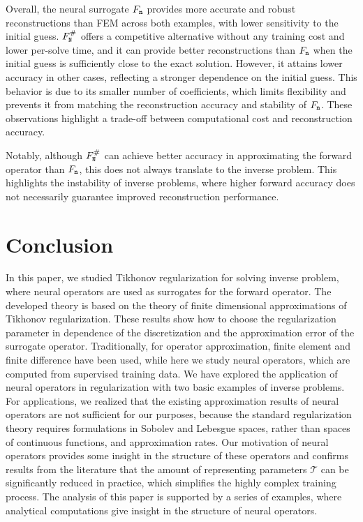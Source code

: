 \documentclass[10pt]{article}
\numberwithin{equation}{section}
\theoremstyle{nonumberplain}
\newcommand{\n}{{\tt n}}
\newcommand{\no}{{\tt N}}
\begin{document}
Overall, the neural surrogate $F_\n$ provides more accurate and robust reconstructions than FEM across both examples, with lower sensitivity to the initial guess. $F_\no^\#$ offers a competitive alternative without any training cost and lower per-solve time, and it can provide better reconstructions than $F_\n$ when the initial guess is sufficiently close to the exact solution. However, it attains lower accuracy in other cases, reflecting a stronger dependence on the initial guess. This behavior is due to its smaller number of coefficients, which limits flexibility and prevents it from matching the reconstruction accuracy and stability of $F_\n$. These observations highlight a trade-off between computational cost and reconstruction accuracy.

Notably, although $F_\no^\#$ can achieve better accuracy in approximating the forward operator than $F_\n$, this does not always translate to the inverse problem. This highlights the instability of inverse problems, where higher forward accuracy does not necessarily guarantee improved reconstruction performance.

\section*{Conclusion}
\label{se:conclusion}

In this paper, we studied Tikhonov regularization for solving inverse problem, where neural operators are used as surrogates for the forward operator. The developed theory is based on the theory of finite dimensional approximations of Tikhonov regularization. These results show how to choose the regularization parameter in dependence of the discretization and the approximation error of the surrogate operator. Traditionally, for operator approximation, finite element and finite difference have been used, while here we study neural operators, which are computed from supervised training data.
We have explored the application of neural operators in regularization with two basic examples of inverse problems. For applications, we realized that the existing approximation results of neural operators are not sufficient for our purposes, because the standard regularization theory requires formulations in Sobolev and Lebesgue spaces, rather than spaces of continuous functions, and approximation rates. Our motivation of neural operators provides some insight in the structure of these operators and confirms results from the literature that the amount of representing parameters $\mathcal{T}$ can be significantly reduced in practice, which simplifies the highly complex training process.
The analysis of this paper is supported by a series of examples, where analytical computations give insight in the structure of neural operators. 
\end{document}
